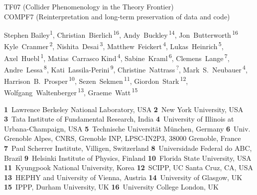 \documentclass[11pt]{article}
\begin{document}
\pubblock

\snowmass{}


\begin{center}{\large
TF07 (Collider Phenomenology in the Theory Frontier)\\
COMPF7 (Reinterpretation and long-term preservation of data and code)}
\end{center}



\begin{center}
Stephen Bailey\textsuperscript{1},
Christian~Bierlich\,\textsuperscript{16},
Andy~Buckley\,\textsuperscript{14},
Jon~Butterworth\,\textsuperscript{16}
Kyle~Cranmer\,\textsuperscript{2},
Nishita~Desai\,\textsuperscript{3},
Matthew~Feickert\,\textsuperscript{4},
Lukas~Heinrich\,\textsuperscript{5},
Axel~Huebl\,\textsuperscript{1},
Matias~Carrasco Kind\,\textsuperscript{4},
Sabine~Kraml\,\textsuperscript{6},
Clemens~Lange\,\textsuperscript{7},
Andre~Lessa\,\textsuperscript{8},
Kati~Lassila-Perini\,\textsuperscript{9},
Christine~Nattrass\,\textsuperscript{?},
Mark~S.~Neubauer\,\textsuperscript{4},
Harrison~B.~Prosper\,\textsuperscript{10},
Sezen~Sekmen\,\textsuperscript{11},
Giordon~Stark\,\textsuperscript{12},
Wolfgang~Waltenberger\,\textsuperscript{13},
Graeme~Watt\,\textsuperscript{15}
\end{center}

\begin{center}
\textbf{1}~Lawrence Berkeley National Laboratory, USA
\textbf{2}~New York University, USA
\textbf{3}~Tata Institute of Fundamental Research, India
\textbf{4}~University of Illinois at Urbana-Champaign, USA
\textbf{5}~Technische Universität München, Germany
\textbf{6}~Univ. Grenoble Alpes, CNRS, Grenoble INP, LPSC-IN2P3, 38000 Grenoble, France
\textbf{7}~Paul Scherrer Institute, Villigen, Switzerland
\textbf{8}~Universidade Federal do ABC, Brazil
\textbf{9}~Helsinki Institute of Physics, Finland
\textbf{10}~Florida State University, USA
\textbf{11}~Kyungpook National University, Korea
\textbf{12}~SCIPP, UC Santa Cruz, CA, USA
\textbf{13}~HEPHY and University of Vienna, Austria
\textbf{14}~University of Glasgow, UK
\textbf{15}~IPPP, Durham University, UK
\textbf{16}~University College London, UK
\end{center}
\end{document}
